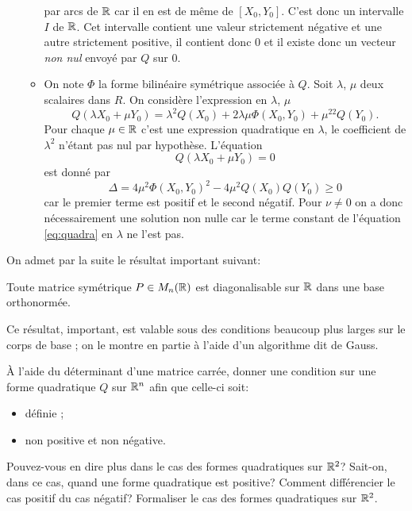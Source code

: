 \documentclass[11pt, a4paper]{article}
\begin{document}
\begin{solution}
\begin{itemize}
\begin{itemize}
      par arcs de $\mathbb{R}$ car il en est de même de $[X_0, Y_0]$. C'est
      donc un intervalle $I$ de $\mathbb{R}$. Cet intervalle contient une
      valeur strictement négative et une autre strictement positive,
      il contient donc $0$ et il existe donc un vecteur \emph{non nul}
      envoyé par $Q$ sur $0$.
    \item On note $\Phi$ la forme bilinéaire symétrique associée à
      $Q$. Soit $\lambda$, $\mu$ deux scalaires dans $R$. On considère
      l'expression en $\lambda$, $\mu$
      \[
      Q(\lambda X_0 + \mu Y_0) = \lambda^2Q(X_0) +
      2\lambda\mu\Phi(X_0, Y_0) + \mu^22Q(Y_0).
      \]
      Pour chaque $\mu \in \mathbb{R}$ c'est une expression quadratique en
      $\lambda$, le coefficient de $\lambda^2$ n'étant pas nul par
      hypothèse. L'équation 
      \begin{equation}
        \label{eq:quadra}
        Q(\lambda X_0 + \mu Y_0) = 0
      \end{equation}
      est donné par
      \[
      \Delta = 4\mu^2\Phi(X_0, Y_0)^2 - 4\mu^2Q(X_0)Q(Y_0) \geq 0
      \]
      car le premier terme est positif et le second négatif. Pour
      $\nu \neq 0$ on a donc nécessairement une solution non nulle car
      le terme constant de l'équation \eqref{eq:quadra} en $\lambda$
      ne l'est pas.
    \end{itemize}
  \end{itemize}
\end{solution}
On admet par la suite le résultat important suivant:
\begin{thm}
  \label{thm:reducsym}
  Toute matrice symétrique $P \in M_n(\mathbb{R})$ est diagonalisable sur
  $\mathbb{R}$ dans une base orthonormée.
\end{thm}
\noindent Ce résultat, important, est valable sous des conditions beaucoup plus
larges sur le corps de base ; on le  montre en partie à l'aide d'un
algorithme dit de Gauss. 
\begin{question}
  \label{qu:critereposdefn}
  À l'aide du déterminant d'une matrice carrée, donner une condition
  sur une forme quadratique $Q$ sur $\mathbb{R}^n$ afin que celle-ci soit:
  \begin{itemize}
  \item[\textbullet]
    définie ;
  \item[\textbullet]
    non positive et non négative.
  \end{itemize}
  Pouvez-vous en dire plus dans le cas des formes quadratiques sur
  $\mathbb{R}^2$? Sait-on, dans ce cas, quand une forme quadratique est
  positive? Comment différencier le cas positif du cas négatif?
  Formaliser le cas des formes quadratiques sur $\mathbb{R}^2$.
\end{question}
\end{document}
